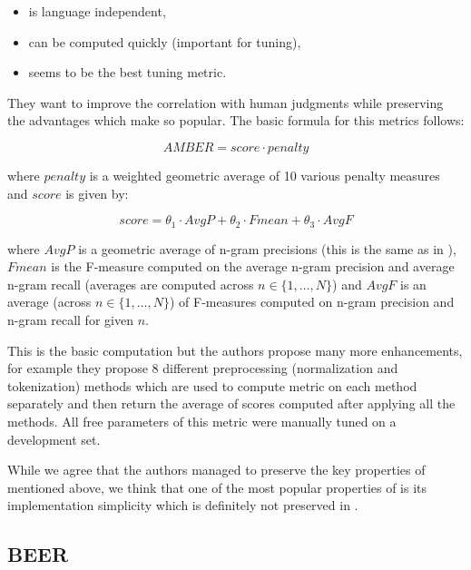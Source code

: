 \begin{itemize}
    \item is language independent,
    \item can be computed quickly (important for tuning),
    \item seems to be the best tuning metric.
\end{itemize}

\noindent They want to improve the correlation with human judgments while
preserving the advantages which make  so popular.
The basic formula for this metrics follows:

\begin{equation*}
    AMBER = score \cdot penalty
\end{equation*}

\noindent where $penalty$ is a weighted geometric average of 10 various penalty
measures and $score$ is given by:

\begin{equation*}
    score  = \theta_1 \cdot AvgP
           + \theta_2 \cdot Fmean 
           + \theta_3 \cdot AvgF 
\end{equation*}

\noindent where $AvgP$ is a geometric average of n-gram precisions (this is the
same as in ), $Fmean$ is the F-measure computed on the average
n-gram precision and average n-gram recall (averages are computed across $n \in
\{1, \ldots, N\}$) and $AvgF$ is an average (across $n \in \{1, \ldots, N\}$)
of F-measures computed on n-gram precision and n-gram recall for given $n$.

This is the basic computation but the authors propose many more enhancements,
for example they propose 8 different preprocessing (normalization and
tokenization) methods which are used to compute  metric on each
method separately and then return the average of scores computed after applying
all the methods. All free parameters of this metric were manually tuned on a
development set.

While we agree that the authors managed to preserve the key properties of
 mentioned above, we think that one of the most popular properties
of  is its implementation simplicity which is definitely not
preserved in . 

\subsection{BEER}

